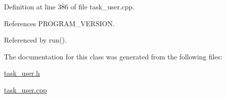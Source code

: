 Definition at line 386 of file task\-\_\-user.\-cpp.



References P\-R\-O\-G\-R\-A\-M\-\_\-\-V\-E\-R\-S\-I\-O\-N.



Referenced by run().



The documentation for this class was generated from the following files\-:\begin{DoxyCompactItemize}
\item 
\hyperlink{task__user_8h}{task\-\_\-user.\-h}\item 
\hyperlink{task__user_8cpp}{task\-\_\-user.\-cpp}\end{DoxyCompactItemize}
